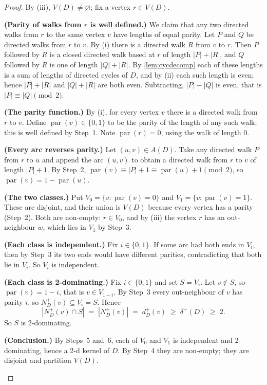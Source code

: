 \documentclass[11pt]{article}
\numberwithin{equation}{section}
\theoremstyle{plain}
\newcommand{\V}{V}
\newcommand{\A}{A}
\newcommand{\Np}{N^{+}}
\newcommand{\dip}{d^{+}}
\newcommand{\dmin}{\delta^{+}}
\begin{document}
\begin{proof}
By (iii), $\V(D)\neq\varnothing$; fix a vertex $r\in\V(D)$.

\begin{steps}
\item\textbf{(Parity of walks from $r$ is well defined.)}
We claim that any two directed walks from $r$ to the same vertex $v$ have lengths of
equal parity. Let $P$ and $Q$ be directed walks from $r$ to $v$. By (i) there is a
directed walk $R$ from $v$ to $r$. Then $P$ followed by $R$ is a closed directed walk
based at $r$ of length $|P|+|R|$, and $Q$ followed by $R$ is one of length $|Q|+|R|$. By
\cref{lem:cycdecomp} each of these lengths is a sum of lengths of directed cycles of
$D$, and by (ii) each such length is even; hence $|P|+|R|$ and $|Q|+|R|$ are both even.
Subtracting, $|P|-|Q|$ is even, that is $|P|\equiv|Q|\pmod 2$.

\item\textbf{(The parity function.)}
By (i), for every vertex $v$ there is a directed walk from $r$ to $v$. Define
$\operatorname{par}(v)\in\{0,1\}$ to be the parity of the length of any such walk; this
is well defined by Step~1. Note $\operatorname{par}(r)=0$, using the walk of length $0$.

\item\textbf{(Every arc reverses parity.)}
Let $(u,v)\in\A(D)$. Take any directed walk $P$ from $r$ to $u$ and append the arc
$(u,v)$ to obtain a directed walk from $r$ to $v$ of length $|P|+1$. By Step~2,
$\operatorname{par}(v)\equiv|P|+1\equiv\operatorname{par}(u)+1\pmod 2$, so
$\operatorname{par}(v)=1-\operatorname{par}(u)$.

\item\textbf{(The two classes.)}
Put $V_0=\{v:\operatorname{par}(v)=0\}$ and $V_1=\{v:\operatorname{par}(v)=1\}$. These are
disjoint, and their union is $\V(D)$ because every vertex has a parity (Step~2). Both are
non-empty: $r\in V_0$, and by (iii) the vertex $r$ has an out-neighbour $w$, which lies
in $V_1$ by Step~3.

\item\textbf{(Each class is independent.)}
Fix $i\in\{0,1\}$. If some arc had both ends in $V_i$, then by Step~3 its two ends would
have different parities, contradicting that both lie in $V_i$. So $V_i$ is independent.

\item\textbf{(Each class is 2-dominating.)}
Fix $i\in\{0,1\}$ and set $S=V_i$. Let $v\notin S$, so $\operatorname{par}(v)=1-i$, that
is $v\in V_{1-i}$. By Step~3 every out-neighbour of $v$ has parity $i$, so
$\Np_D(v)\subseteq V_i=S$. Hence
\[
  |\Np_D(v)\cap S| \;=\; |\Np_D(v)| \;=\; \dip_D(v) \;\ge\; \dmin(D) \;\ge\; 2 .
\]
So $S$ is 2-dominating.

\item\textbf{(Conclusion.)}
By Steps~5 and~6, each of $V_0$ and $V_1$ is independent and 2-dominating, hence a
2-d kernel of $D$. By Step~4 they are non-empty; they are disjoint and partition $\V(D)$.
\end{steps}
\end{proof}
\end{document}
